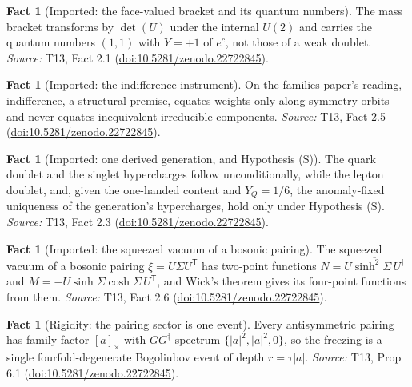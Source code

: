 \documentclass[11pt]{article}
\theoremstyle{definition}
\newtheorem{fact}[theorem]{Fact}
\theoremstyle{plain}
\begin{document}
\begin{fact}[Imported: the face-valued bracket and its quantum numbers]\label{c:families.imported-face-valued-bracket-quantum-numbers}
The mass bracket transforms by $\det(U)$ under the internal $U(2)$ and carries the quantum numbers $(1,1)$ with $Y = +1$ of $e^{c}$, not those of a weak doublet.
\emph{Source:} T13, Fact 2.1 (\href{https://doi.org/10.5281/zenodo.22722845}{doi:10.5281/zenodo.22722845}).
\end{fact}

\begin{fact}[Imported: the indifference instrument]\label{c:families.imported-indifference-instrument}
On the families paper's reading, indifference, a structural premise, equates weights only along symmetry orbits and never equates inequivalent irreducible components.
\emph{Source:} T13, Fact 2.5 (\href{https://doi.org/10.5281/zenodo.22722845}{doi:10.5281/zenodo.22722845}).
\end{fact}

\begin{fact}[Imported: one derived generation, and Hypothesis (S)]\label{c:families.imported-one-derived-generation-hypothesis-s}
The quark doublet and the singlet hypercharges follow unconditionally, while the lepton doublet, and, given the one-handed content and $Y_{Q} = 1/6$, the anomaly-fixed uniqueness of the generation's hypercharges, hold only under Hypothesis (S).
\emph{Source:} T13, Fact 2.3 (\href{https://doi.org/10.5281/zenodo.22722845}{doi:10.5281/zenodo.22722845}).
\end{fact}

\begin{fact}[Imported: the squeezed vacuum of a bosonic pairing]\label{c:families.imported-squeezed-vacuum-bosonic-pairing}
The squeezed vacuum of a bosonic pairing $\xi = U\Sigma U^{\mathsf{T}}$ has two-point functions $N = \overline{U\sinh^{2}\Sigma\,U^{\dagger}}$ and $M = -U\sinh\Sigma\cosh\Sigma\,U^{\mathsf{T}}$, and Wick's theorem gives its four-point functions from them.
\emph{Source:} T13, Fact 2.6 (\href{https://doi.org/10.5281/zenodo.22722845}{doi:10.5281/zenodo.22722845}).
\end{fact}

\begin{fact}[Rigidity: the pairing sector is one event]\label{c:families.rigidity-pairing-sector-one-event}
Every antisymmetric pairing has family factor $[a]_{\times}$ with $GG^{\dagger}$ spectrum $\{|a|^{2}, |a|^{2}, 0\}$, so the freezing is a single fourfold-degenerate Bogoliubov event of depth $r = \tau|a|$.
\emph{Source:} T13, Prop 6.1 (\href{https://doi.org/10.5281/zenodo.22722845}{doi:10.5281/zenodo.22722845}).
\end{fact}
\end{document}
